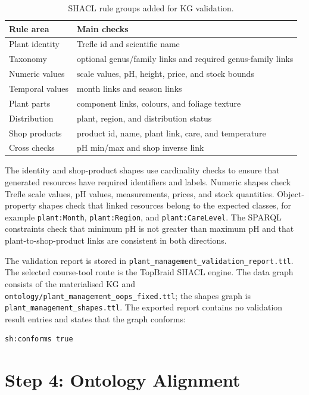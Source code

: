 \documentclass[11pt,a4paper]{article}
\newcommand{\artifact}[1]{\texttt{#1}}
\begin{document}
\begin{table}[h]
\centering
\begin{tabular}{ll}
\toprule
Rule area & Main checks \\
\midrule
Plant identity & Trefle id and scientific name \\
Taxonomy & optional genus/family links and required genus-family links \\
Numeric values & scale values, pH, height, price, and stock bounds \\
Temporal values & month links and season links \\
Plant parts & component links, colours, and foliage texture \\
Distribution & plant, region, and distribution status \\
Shop products & product id, name, plant link, care, and temperature \\
Cross checks & pH min/max and shop inverse link \\
\bottomrule
\end{tabular}
\caption{SHACL rule groups added for KG validation.}
\label{tab:shacl-rule-groups}
\end{table}

The identity and shop-product shapes use cardinality checks to ensure that
generated resources have required identifiers and labels. Numeric shapes check
Trefle scale values, pH values, measurements, prices, and stock quantities.
Object-property shapes check that linked resources belong to the expected
classes, for example \artifact{plant:Month}, \artifact{plant:Region}, and
\artifact{plant:CareLevel}. The SPARQL constraints check that minimum pH is not
greater than maximum pH and that plant-to-shop-product links are consistent in
both directions.

The validation report is stored in
\artifact{plant\_management\_validation\_report.ttl}. The selected course-tool
route is the TopBraid SHACL engine. The data graph consists of the materialised
KG and \artifact{ontology/plant\_management\_oops\_fixed.ttl}; the shapes graph
is \artifact{plant\_management\_shapes.ttl}. The exported report contains no
validation result entries and states that the graph conforms:

\begin{lstlisting}[caption={SHACL validation result in plant\_management\_validation\_report.ttl.}]
sh:conforms true
\end{lstlisting}

\section{Step 4: Ontology Alignment}
\end{document}
